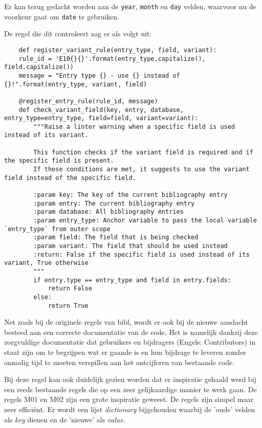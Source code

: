 Er kan terug gedacht worden aan de \texttt{year}, \texttt{month} en \texttt{day} velden, waarvoor nu de voorkeur gaat om \texttt{date} te gebruiken.

De regel die dit controleert zag er als volgt uit:
\begin{verbatim}
    def register_variant_rule(entry_type, field, variant):
    rule_id = 'E10{}{}'.format(entry_type.capitalize(), field.capitalize())
    message = "Entry type {} - use {} instead of {}!".format(entry_type, variant, field)

    @register_entry_rule(rule_id, message)
    def check_variant_field(key, entry, database, entry_type=entry_type, field=field, variant=variant):
        """Raise a linter warning when a specific field is used instead of its variant.

        This function checks if the variant field is required and if the specific field is present.
        If these conditions are met, it suggests to use the variant field instead of the specific field.

        :param key: The key of the current bibliography entry
        :param entry: The current bibliography entry
        :param database: All bibliography entries
        :param entry_type: Anchor variable to pass the local variable `entry_type` from outer scope
        :param field: The field that is being checked
        :param variant: The field that should be used instead
        :return: False if the specific field is used instead of its variant, True otherwise
        """
        if entry.type == entry_type and field in entry.fields:
            return False
        else:
            return True
\end{verbatim}
Net zoals bij de originele regels van bibl, wordt er ook bij de nieuwe aandacht besteed aan een correcte documentatie van de code. Het is namelijk dankzij deze zorgvuldige documentatie dat gebruikers en bijdragers (Engels: Contributors) in staat zijn om te begrijpen wat er gaande is en hun bijdrage te leveren zonder onnodig tijd te moeten verspillen aan het ontcijferen van bestaande code.

Bij deze regel kan ook duidelijk gezien worden dat er inspiratie gehaald werd bij een reeds bestaande regels die op een zeer gelijkaardige manier te werk gaan. De regels M01 en M02 zijn een grote inspiratie geweest. De regels zijn simpel maar zeer efficiënt. Er wordt een lijst \emph{dictionary} bijgehouden waarbij de 'oude' velden als \emph{key} dienen en de 'nieuwe' als \emph{value}.

